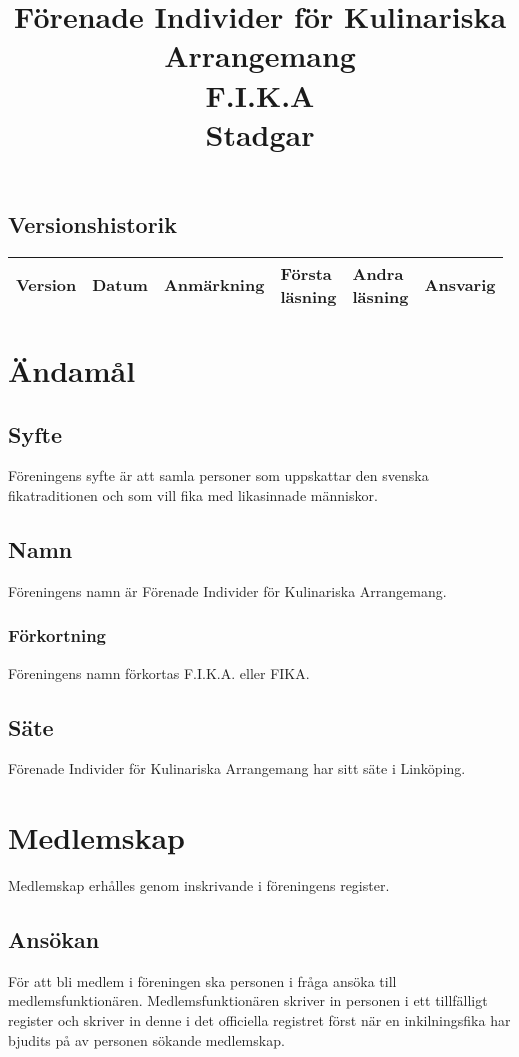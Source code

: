 \documentclass{article}
\title{Förenade Individer för Kulinariska Arrangemang \\
                F.I.K.A \\
                Stadgar}
\author{}
\date{\documentdate}
\begin{document}
\maketitle
\newpage

\subsection*{Versionshistorik}

\begin{tabularx}{\textwidth}{|l|l|X|l|l|l|}
\hline
Version & Datum & Anmärkning & \makecell{Första\\läsning} &
\makecell{Andra\\läsning} & Ansvarig \\
\hline
\end{tabularx}
\newpage

\tableofcontents
\newpage
{}

\section{Ändamål}
\subsection{Syfte}
Föreningens syfte är att samla personer som uppskattar den svenska
fikatraditionen och som vill fika med likasinnade människor.
\subsection{Namn}
Föreningens namn är Förenade Individer för Kulinariska Arrangemang.
\subsubsection{Förkortning}
Föreningens namn förkortas F.I.K.A. eller FIKA.
\subsection{Säte}
Förenade Individer för Kulinariska Arrangemang har sitt säte i Linköping.


\section{Medlemskap}
Medlemskap erhålles genom inskrivande i föreningens register.
\subsection{Ansökan}
För att bli medlem i föreningen ska personen i fråga ansöka till
medlemsfunktionären. Medlemsfunktionären skriver in personen i ett tillfälligt
register och skriver in denne i det officiella registret först när en
inkilningsfika har bjudits på av personen sökande medlemskap.
\end{document}

